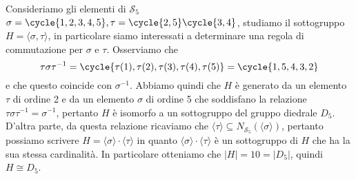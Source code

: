 \documentclass[11pt]{scrartcl}
\begin{document}
Consideriamo gli elementi di $\mathcal{S}_5$ $\sigma = \cycle{1, 2, 3, 4, 5}, 
\tau = \cycle{2, 5}\cycle{3, 4}$, studiamo il sottogruppo $H = \langle\sigma, \tau\rangle$,
in particolare siamo interessati a determinare una regola di commutazione
per $\sigma$ e $\tau$. Osserviamo che 
\[
    \tau\sigma\tau^{-1} = \cycle{\tau(1), \tau(2), \tau(3), \tau(4), \tau(5)} = 
    \cycle{1, 5, 4, 3, 2}
\]
e che questo coincide con $\sigma^{-1}$. Abbiamo quindi che $H$ è generato 
da un elemento $\tau$ di ordine 2 e da un elemento $\sigma$ di ordine 5 
che soddisfano la relazione $\tau\sigma\tau^{-1} = \sigma^{-1}$, pertanto 
$H$ è isomorfo a un sottogruppo del gruppo diedrale $D_5$. D'altra parte, 
da questa relazione ricaviamo che $\langle \tau\rangle \subseteq N_{\mathcal{S}_5}(\langle\sigma\rangle)$,
pertanto possiamo scrivere $H = \langle\sigma\rangle\cdot\langle\tau\rangle$
in quanto $\langle\sigma\rangle\cdot\langle\tau\rangle$ è un sottogruppo di $H$
che ha la sua stessa cardinalità. In particolare otteniamo che $|H| = 10 = |D_5|$,
quindi $H \cong D_5$.\\

\end{document}
